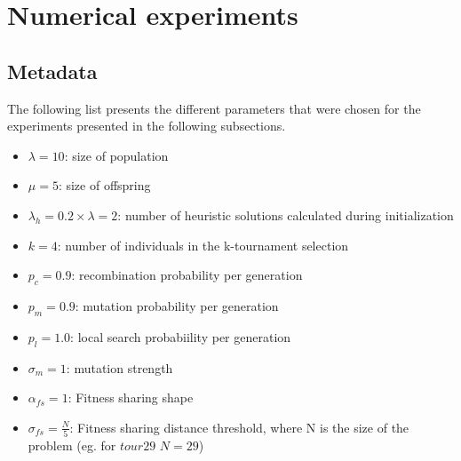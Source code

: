\documentclass[a4paper,10pt]{article}
\newcommand{\ReplaceMe}[1]{{\color{blue}#1}}
\newcommand{\RemoveMe}[1]{{\color{purple}#1}}
\begin{document}
\section{Numerical experiments} \label{s:numerical_experiments}


\subsection{Metadata} \label{ss:metadata}



The following list presents the different parameters that were chosen for the experiments presented in the following subsections. 
\begin{itemize}
\item $\lambda = 10$: size of population
\item $\mu = 5$: size of offspring
\item $\lambda_h = 0.2 \times \lambda = 2$: number of heuristic solutions calculated during initialization
\item $k = 4$: number of individuals in the k-tournament selection
\item $p_c = 0.9$: recombination probability per generation
\item $p_m = 0.9$: mutation probability per generation
\item $p_l = 1.0$: local search probabiility per generation
\item $\sigma_m = 1$: mutation strength
\item $\alpha_{fs} = 1$: Fitness sharing shape
\item $\sigma_{fs} = \frac{N}{5}$: Fitness sharing distance threshold, where N is the size of the problem (eg. for $tour29$ $N=29$)
\end{itemize}
\end{document}
